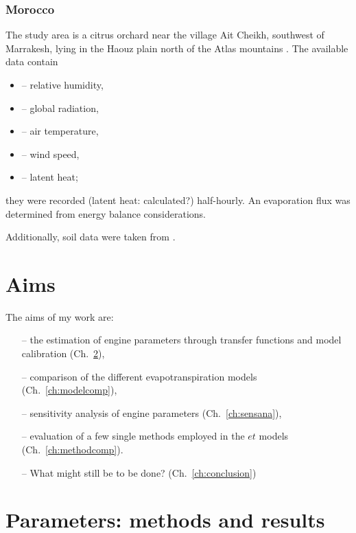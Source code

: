 \documentclass{scrreprt}
\newenvironment{denseitem}{
  \begin{itemize}
    \setlength{\itemsep}{0pt}
    \setlength{\parskip}{0pt}
    \setlength{\parsep}{0pt}
}{
  \end{itemize}
}
\begin{document}
\newpage
\subsection{Morocco} \label{ssec:intro_areas_morocco}

The study area is a citrus orchard near the village Ait Cheikh, southwest of Marrakesh, lying in the Haouz plain north of the Atlas mountains \citep{mroos14}.
The available data contain
\begin{denseitem}
  \item[--] relative humidity,
  \item[--] global radiation,
  \item[--] air temperature,
  \item[--] wind speed,
  \item[--] latent heat;
\end{denseitem}
%
they were recorded (latent heat: calculated?) half-hourly.
An evaporation flux was determined from energy balance considerations.

Additionally, soil data were taken from \citet{mroos14}.


\chapter{Aims} \label{ch:aims}

The aims of my work are:
\begin{itemize}
  \item[--] the estimation of engine parameters through transfer functions and model calibration (Ch.~\ref{ch:parest}),
  \item[--] comparison of the different evapotranspiration models (Ch.~\ref{ch:modelcomp}),
  \item[--] sensitivity analysis of engine parameters (Ch.~\ref{ch:sensana}),
  \item[--] evaluation of a few single methods employed in the $et$ models (Ch.~\ref{ch:methodcomp}).
  \item[--] What might still be to be done? (Ch.~\ref{ch:conclusion})
\end{itemize}


\chapter{Parameters: methods and results} \label{ch:parest}
\end{document}
